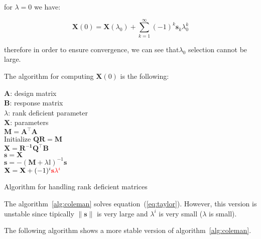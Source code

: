 \noindent for $\lambda=0$ we have:

\begin{equation}
\label{eq:taylor}
    \mathbf{X}(0)=\mathbf{X}(\lambda_0) + \sum_{k=1}^\infty
     (-1)^k \mathbf{s}_k \lambda_0^k
\end{equation}


\noindent therefore in order to ensure convergence, we can see that$\lambda_0$
selection cannot be large. 

The algorithm for computing $\mathbf{X}(0)$ is the following:

\begin{algorithm}[H]
\begin{algorithmic}[1]
\REQUIRE $\,$ \\
$\mathbf{A}$: design matrix \\
$\mathbf{B}$: response matrix \\
$\lambda$: rank deficient parameter \\
\ENSURE  $\,$ \\
$\mathbf{X}$: parameters \\
\STATE $\mathbf{M}=\mathbf{A^\top A}$ \\
\STATE Initialize $\mathbf{Q R}=\mathbf{M}$ \\
\STATE $\mathbf{X} = \mathbf{R^{-1}Q^\top B}$ \\
\STATE $\mathbf{s} = \mathbf{X}$ \\
	\STATE $\mathbf{s} =
        -(\mathbf{M}+\lambda\mathbb{I})^{-1}\mathbf{s}$\\
	\STATE $\mathbf{X}=\mathbf{X} + (-1)^i {\color{red}\mathbf{s}
        \lambda^i}$
\ENDFOR
\end{algorithmic}
\caption{Algorithm for handling rank deficient matrices}
\label{alg:coleman}
\end{algorithm}

The algorithm~\ref{alg:coleman} solves equation~(\ref{eq:taylor}). However, this
version is unstable since tipically $\|\mathbf{s}\|$ is very large and
$\lambda^i$ is very small ($\lambda$ is small).

The following algorithm shows a more stable version of
algorithm~\ref{alg:coleman}.


